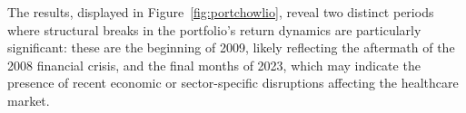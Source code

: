 The results, displayed in Figure~\ref{fig:portchowlio}, reveal two distinct periods where structural breaks in the portfolio's
return dynamics are particularly significant: these are the beginning of 2009, likely reflecting the aftermath of the 2008
financial crisis, and the final months of 2023, which may indicate the presence of recent economic or sector-specific
disruptions affecting the healthcare market.
